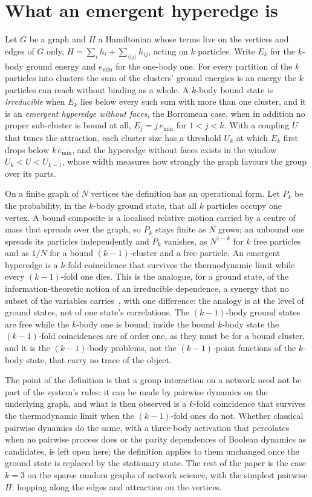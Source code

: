 \documentclass[aps,pre,twocolumn,superscriptaddress,floatfix]{revtex4-2}
\begin{document}
\section{What an emergent hyperedge is}
\label{sec:def}
Let $G$ be a graph and $H$ a Hamiltonian whose terms live on the vertices
and edges of $G$ only, $H=\sum_{i}h_{i}+\sum_{\langle ij\rangle}h_{ij}$,
acting on $k$ particles. Write $E_{k}$ for the $k$-body ground energy and
$e_{\min}$ for the one-body one. For every partition of the $k$ particles
into clusters the sum of the clusters' ground energies is an energy the
$k$ particles can reach without binding as a whole. A $k$-body bound
state is \emph{irreducible} when $E_{k}$ lies below every such sum with
more than one cluster, and it is an \emph{emergent hyperedge without
faces}, the Borromean case, when in addition no proper sub-cluster is
bound at all, $E_{j}=j\,e_{\min}$ for $1<j<k$. With a coupling $U$ that
tunes the attraction, each cluster size has a threshold $U_{k}$ at which
$E_{k}$ first drops below $k\,e_{\min}$, and the hyperedge without faces
exists in the window $U_{k}<U<U_{k-1}$, whose width measures how
strongly the graph favours the group over its parts.

On a finite graph of $N$ vertices the definition has an operational
form. Let $P_{k}$ be the probability, in the $k$-body ground state, that
all $k$ particles occupy one vertex. A bound composite is a localised
relative motion carried by a centre of mass that spreads over the graph,
so $P_{k}$ stays finite as $N$ grows; an unbound one spreads its
particles independently and $P_{k}$ vanishes, as $N^{1-k}$ for $k$ free
particles and as $1/N$ for a bound $(k-1)$-cluster and a free particle. An emergent hyperedge is a
$k$-fold coincidence that survives the thermodynamic limit while every
$(k-1)$-fold one dies. This is the analogue, for a ground state, of the
information-theoretic notion of an irreducible dependence, a synergy that
no subset of the variables carries~\cite{williams2010,rosas2019}, with
one difference: the analogy is at the level of ground states, not of one
state's correlations. The $(k-1)$-body ground states are free while the
$k$-body one is bound; inside the bound $k$-body state the $(k-1)$-fold
coincidences are of order one, as they must be for a bound cluster, and
it is the $(k-1)$-body problems, not the $(k-1)$-point functions of the
$k$-body state, that carry no trace of the object.

The point of the definition is that a group interaction on a network
need not be part of the system's rules: it can be made by pairwise
dynamics on the underlying graph, and what is then observed is a
$k$-fold coincidence that survives the thermodynamic limit when the
$(k-1)$-fold ones do not. Whether classical pairwise dynamics do the
same, with a three-body activation that percolates when no pairwise
process does or the parity dependences of Boolean dynamics as
candidates, is left open here; the definition applies to them unchanged
once the ground state is replaced by the stationary state. The rest of
the paper is the case $k=3$ on the sparse random graphs of network
science, with the simplest pairwise $H$: hopping along the edges and
attraction on the vertices.
\end{document}
